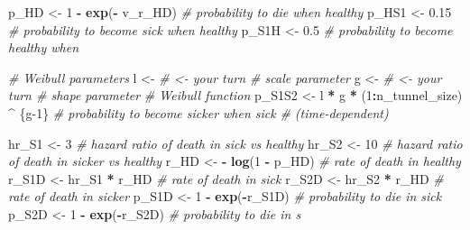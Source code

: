 \documentclass[
]{article}
\newenvironment{Shaded}{\begin{snugshade}}{\end{snugshade}}
\newcommand{\CommentTok}[1]{\textcolor[rgb]{0.56,0.35,0.01}{\textit{#1}}}
\newcommand{\DecValTok}[1]{\textcolor[rgb]{0.00,0.00,0.81}{#1}}
\newcommand{\FloatTok}[1]{\textcolor[rgb]{0.00,0.00,0.81}{#1}}
\newcommand{\KeywordTok}[1]{\textcolor[rgb]{0.13,0.29,0.53}{\textbf{#1}}}
\newcommand{\NormalTok}[1]{#1}
\newcommand{\OperatorTok}[1]{\textcolor[rgb]{0.81,0.36,0.00}{\textbf{#1}}}
\newcommand{\StringTok}[1]{\textcolor[rgb]{0.31,0.60,0.02}{#1}}
\begin{document}
\begin{Shaded}
\begin{Highlighting}[]
{{{\NormalTok{p_HD    <-}\StringTok{ }\DecValTok{1} \OperatorTok{-}\StringTok{ }\KeywordTok{exp}\NormalTok{(}\OperatorTok{-}\StringTok{ }\NormalTok{v_r_HD)  }\CommentTok{# probability to die when healthy}
\NormalTok{p_HS1   <-}\StringTok{ }\FloatTok{0.15}                 \CommentTok{# probability to become sick when healthy}
\NormalTok{p_S1H   <-}\StringTok{ }\FloatTok{0.5}                  \CommentTok{# probability to become healthy when }

\CommentTok{# Weibull parameters}
\NormalTok{l       <-}\StringTok{ }\CommentTok{# <-  your turn  # scale parameter}
\NormalTok{g       <-}\StringTok{ }\CommentTok{# <-  your turn  # shape parameter}
\CommentTok{# Weibull function}
\NormalTok{p_S1S2  <-}\StringTok{ }\NormalTok{l }\OperatorTok{*}\StringTok{ }\NormalTok{g }\OperatorTok{*}\StringTok{ }\NormalTok{(}\DecValTok{1}\OperatorTok{:}\NormalTok{n_tunnel_size) }\OperatorTok{^}\StringTok{ }\NormalTok{\{g}\DecValTok{-1}\NormalTok{\} }\CommentTok{# probability to become sicker when sick }
                                             \CommentTok{# (time-dependent)}

\NormalTok{hr_S1   <-}\StringTok{ }\DecValTok{3}                  \CommentTok{# hazard ratio of death in sick vs healthy}
\NormalTok{hr_S2   <-}\StringTok{ }\DecValTok{10}                 \CommentTok{# hazard ratio of death in sicker vs healthy }
\NormalTok{r_HD    <-}\StringTok{ }\OperatorTok{-}\StringTok{ }\KeywordTok{log}\NormalTok{(}\DecValTok{1} \OperatorTok{-}\StringTok{ }\NormalTok{p_HD)  }\CommentTok{# rate of death in healthy}
\NormalTok{r_S1D   <-}\StringTok{ }\NormalTok{hr_S1 }\OperatorTok{*}\StringTok{ }\NormalTok{r_HD       }\CommentTok{# rate of death in sick}
\NormalTok{r_S2D   <-}\StringTok{ }\NormalTok{hr_S2 }\OperatorTok{*}\StringTok{ }\NormalTok{r_HD       }\CommentTok{# rate of death in sicker}
\NormalTok{p_S1D   <-}\StringTok{ }\DecValTok{1} \OperatorTok{-}\StringTok{ }\KeywordTok{exp}\NormalTok{(}\OperatorTok{-}\NormalTok{r_S1D)  }\CommentTok{# probability to die in sick}
\NormalTok{p_S2D   <-}\StringTok{ }\DecValTok{1} \OperatorTok{-}\StringTok{ }\KeywordTok{exp}\NormalTok{(}\OperatorTok{-}\NormalTok{r_S2D)  }\CommentTok{# probability to die in s}

}}}
\end{Highlighting}
\end{Shaded}
\end{document}
